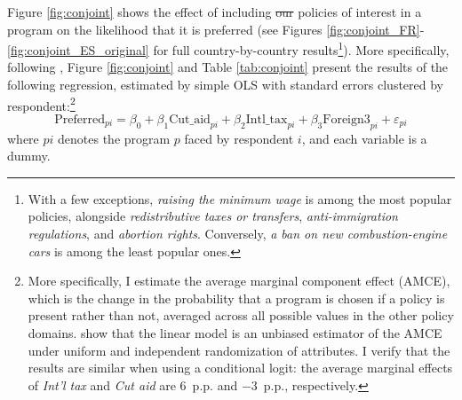 \documentclass[12pt,english]{article}
\makeatletter
\providecommand{\DIFaddtex}[1]{{\protect\color{blue}\uwave{#1}}} %
\providecommand{\DIFdeltex}[1]{{\protect\color{red}\sout{#1}}} %
\providecommand{\DIFaddbegin}{} %
\providecommand{\DIFaddend}{} %
\providecommand{\DIFdelbegin}{} %
\providecommand{\DIFdelend}{} %
\providecommand{\DIFadd}[1]{\texorpdfstring{\DIFaddtex{#1}}{#1}} %
\providecommand{\DIFdel}[1]{\texorpdfstring{\DIFdeltex{#1}}{}} %
\providecommand{\DIFscaledelfig}{0.5}
\newlength{\DIFdelgraphicswidth} %
\newlength{\DIFdelgraphicsheight} %
\providecommand{\DIFaddincludegraphics}[2][]{{\color{blue}\fbox{\DIFOincludegraphics[#1]{#2}}}} %
\providecommand{\DIFdelincludegraphics}[2][]{%
\sbox{\DIFdelgraphicsbox}{\DIFOincludegraphics[#1]{#2}}%
\settoboxwidth{\DIFdelgraphicswidth}{\DIFdelgraphicsbox} %
\settoboxtotalheight{\DIFdelgraphicsheight}{\DIFdelgraphicsbox} %
\scalebox{\DIFscaledelfig}{%
\parbox[b]{\DIFdelgraphicswidth}{\usebox{\DIFdelgraphicsbox}\\[-\baselineskip] \rule{\DIFdelgraphicswidth}{0em}}\llap{\resizebox{\DIFdelgraphicswidth}{\DIFdelgraphicsheight}{%
\setlength{\unitlength}{\DIFdelgraphicswidth}%
\begin{picture}(1,1)%
\thicklines\linethickness{2pt} %
{\color[rgb]{1,0,0}\put(0,0){\framebox(1,1){}}}%
{\color[rgb]{1,0,0}\put(0,0){\line( 1,1){1}}}%
{\color[rgb]{1,0,0}\put(0,1){\line(1,-1){1}}}%
\end{picture}%
}\hspace*{3pt}}} %
} %
\DeclareRobustCommand{\DIFaddbegin}{\DIFOaddbegin \let\includegraphics\DIFaddincludegraphics} %
\DeclareRobustCommand{\DIFaddend}{\DIFOaddend \let\includegraphics\DIFOincludegraphics} %
\DeclareRobustCommand{\DIFdelbegin}{\DIFOdelbegin \let\includegraphics\DIFdelincludegraphics} %
\DeclareRobustCommand{\DIFdelend}{\DIFOaddend \let\includegraphics\DIFOincludegraphics} %
\let\sout@orig\sout %
\renewcommand{\sout}[1]{\ifmmode\text{\sout@orig{\ensuremath{#1}}}\else\sout@orig{#1}\fi} %
\makeatother
\begin{document}
Figure \ref{fig:conjoint} shows the effect of including \DIFdelbegin \DIFdel{our }\DIFdelend \DIFaddbegin \DIFadd{the }\DIFaddend policies of interest in a program on the likelihood that it is preferred (see Figures \ref{fig:conjoint_FR}-\ref{fig:conjoint_ES_original} for full country-by-country results\footnote{With a few exceptions, \textit{raising the minimum wage} is among the most popular policies, alongside \textit{redistributive taxes or transfers}, \textit{anti-immigration regulations}, and \textit{abortion rights}. 
Conversely, \textit{a ban on new combustion-engine cars} is among the least popular ones.}). 
More specifically, following \cite{hainmueller_causal_2014}, Figure \ref{fig:conjoint} and Table \ref{tab:conjoint} present the results %
of the following regression, estimated by simple OLS with standard errors clustered by respondent:\footnote{More specifically, I estimate the average marginal component effect (AMCE), which is the change in the probability that a program is chosen if a policy is present rather than not, averaged across all possible values in the other policy domains. \cite{hainmueller_causal_2014} show that the linear model is an unbiased estimator of the AMCE under uniform and independent randomization of attributes. %
I verify that the results are similar when using a conditional logit: the average marginal effects of \textit{Int'l tax} and \textit{Cut aid} are 6~p.p. and $-$3~p.p., respectively.}
\begin{equation}\label{eq:conjoint}
\text{Preferred}_{pi} = \beta_0 + \beta_1 \text{Cut\_aid}_{pi} + \beta_2 \text{Intl\_tax}_{pi} + \beta_3 \text{Foreign3}_{pi} + \varepsilon_{pi}  
\end{equation}
where $pi$ denotes the %
program $p$ faced by respondent $i$, and each variable is a dummy. 
\end{document}
